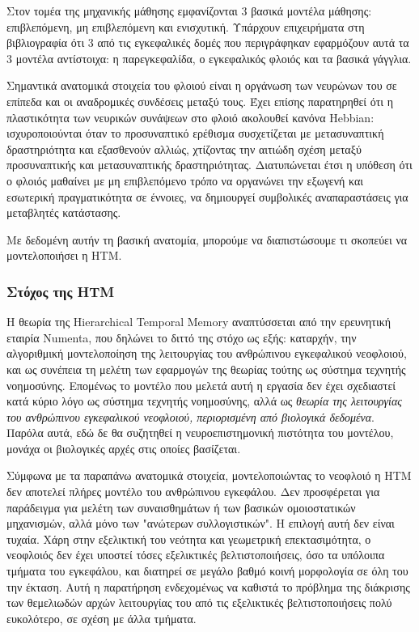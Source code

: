   Στον τομέα της μηχανικής μάθησης εμφανίζονται 3 βασικά μοντέλα μάθησης: επιβλεπόμενη, μη επιβλεπόμενη και ενισχυτική.
  Υπάρχουν επιχειρήματα στη βιβλιογραφία \parencite{doyaWhatAreComputations1999} ότι 3 από τις εγκεφαλικές δομές που περιγράφηκαν εφαρμόζουν
  αυτά τα 3 μοντέλα αντίστοιχα: η παρεγκεφαλίδα, ο εγκεφαλικός φλοιός και τα βασικά γάγγλια.

  Σημαντικά ανατομικά στοιχεία του φλοιού είναι η οργάνωση των νευρώνων του σε επίπεδα και οι αναδρομικές συνδέσεις μεταξύ τους.
  Έχει επίσης παρατηρηθεί ότι η πλαστικότητα των νευρικών συνάψεων στο φλοιό ακολουθεί κανόνα Hebbian:
  ισχυροποιούνται όταν το προσυναπτικό ερέθισμα συσχετίζεται με μετασυναπτική δραστηριότητα και εξασθενούν αλλιώς,
  χτίζοντας την αιτιώδη σχέση μεταξύ προσυναπτικής και μετασυναπτικής δραστηριότητας.
  Διατυπώνεται έτσι η υπόθεση ότι ο φλοιός μαθαίνει με μη επιβλεπόμενο τρόπο να οργανώνει την εξωγενή και εσωτερική πραγματικότητα σε έννοιες,
  να δημιουργεί συμβολικές αναπαραστάσεις για μεταβλητές κατάστασης.

  Με δεδομένη αυτήν τη βασική ανατομία, μπορούμε να διαπιστώσουμε τι σκοπεύει να μοντελοποιήσει η HTM.

\subsubsection{Στόχος της HTM}

  Η θεωρία της Hierarchical Temporal Memory αναπτύσσεται από την ερευνητική εταιρία Numenta, που δηλώνει το διττό της στόχο ως εξής:
  καταρχήν, την αλγοριθμική μοντελοποίηση της λειτουργίας του ανθρώπινου εγκεφαλικού νεοφλοιού,
  και ως συνέπεια τη μελέτη των εφαρμογών της θεωρίας τούτης ως σύστημα τεχνητής νοημοσύνης.
  Επομένως το μοντέλο που μελετά αυτή η εργασία δεν έχει σχεδιαστεί κατά κύριο λόγο ως σύστημα τεχνητής νοημοσύνης,
  αλλά ως \textit{θεωρία της λειτουργίας του ανθρώπινου εγκεφαλικού νεοφλοιού, περιορισμένη από βιολογικά δεδομένα}.
  Παρόλα αυτά, εδώ δε θα συζητηθεί η νευροεπιστημονική πιστότητα του μοντέλου, μονάχα οι βιολογικές αρχές στις οποίες βασίζεται.

  Σύμφωνα με τα παραπάνω ανατομικά στοιχεία, μοντελοποιώντας το νεοφλοιό η HTM δεν αποτελεί πλήρες μοντέλο
  του ανθρώπινου εγκεφάλου. Δεν προσφέρεται για παράδειγμα για μελέτη των συναισθημάτων ή των βασικών ομοιοστατικών
  μηχανισμών, αλλά μόνο των "ανώτερων συλλογιστικών". Η επιλογή αυτή δεν είναι τυχαία. Χάρη στην εξελικτική του νεότητα και
  γεωμετρική επεκτασιμότητα, ο νεοφλοιός δεν έχει υποστεί τόσες εξελικτικές βελτιστοποιήσεις, όσο τα υπόλοιπα τμήματα του εγκεφάλου,
  και διατηρεί σε μεγάλο βαθμό κοινή μορφολογία σε όλη του την έκταση. Αυτή η παρατήρηση ενδεχομένως να καθιστά το πρόβλημα
  της διάκρισης των θεμελιωδών αρχών λειτουργίας του από τις εξελικτικές βελτιστοποιήσεις πολύ ευκολότερο, σε σχέση με άλλα τμήματα.
